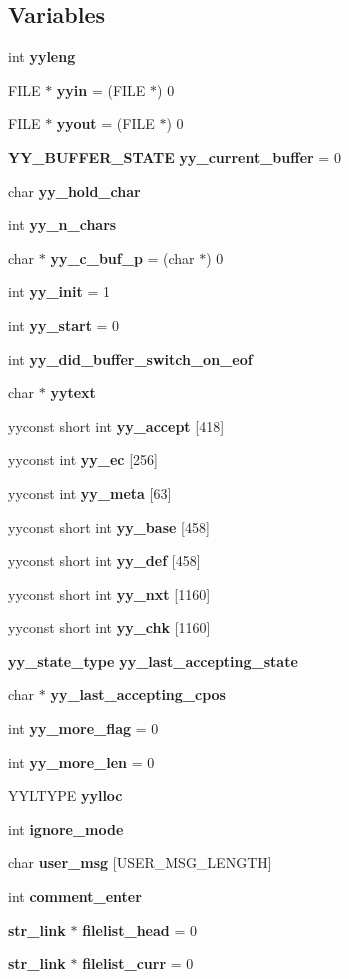 \subsection*{Variables}
\begin{CompactItemize}
\item 
int {\bf yyleng}
\item 
FILE $\ast$ {\bf yyin} = (FILE $\ast$) 0
\item 
FILE $\ast$ {\bf yyout} = (FILE $\ast$) 0
\item 
{\bf YY\_\-BUFFER\_\-STATE} {\bf yy\_\-current\_\-buffer} = 0
\item 
char {\bf yy\_\-hold\_\-char}
\item 
int {\bf yy\_\-n\_\-chars}
\item 
char $\ast$ {\bf yy\_\-c\_\-buf\_\-p} = (char $\ast$) 0
\item 
int {\bf yy\_\-init} = 1
\item 
int {\bf yy\_\-start} = 0
\item 
int {\bf yy\_\-did\_\-buffer\_\-switch\_\-on\_\-eof}
\item 
char $\ast$ {\bf yytext}
\item 
yyconst short int {\bf yy\_\-accept} [418]
\item 
yyconst int {\bf yy\_\-ec} [256]
\item 
yyconst int {\bf yy\_\-meta} [63]
\item 
yyconst short int {\bf yy\_\-base} [458]
\item 
yyconst short int {\bf yy\_\-def} [458]
\item 
yyconst short int {\bf yy\_\-nxt} [1160]
\item 
yyconst short int {\bf yy\_\-chk} [1160]
\item 
{\bf yy\_\-state\_\-type} {\bf yy\_\-last\_\-accepting\_\-state}
\item 
char $\ast$ {\bf yy\_\-last\_\-accepting\_\-cpos}
\item 
int {\bf yy\_\-more\_\-flag} = 0
\item 
int {\bf yy\_\-more\_\-len} = 0
\item 
YYLTYPE {\bf yylloc}
\item 
int {\bf ignore\_\-mode}
\item 
char {\bf user\_\-msg} [USER\_\-MSG\_\-LENGTH]
\item 
int {\bf comment\_\-enter}
\item 
{\bf str\_\-link} $\ast$ {\bf filelist\_\-head} = 0
\item 
{\bf str\_\-link} $\ast$ {\bf filelist\_\-curr} = 0

\end{CompactItemize}
